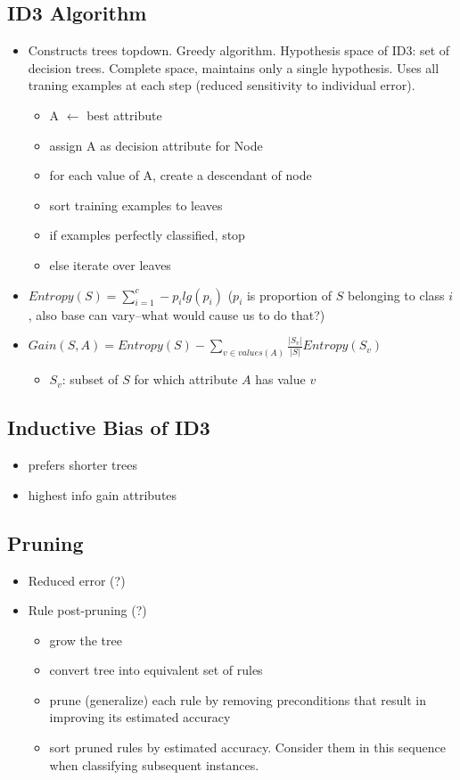 \documentclass[11pt]{article}
\begin{document}
\subsection{ID3 Algorithm}
\begin{itemize}
\item Constructs trees topdown. Greedy algorithm. Hypothesis space of ID3: set of decision trees. Complete space, maintains only a single hypothesis. Uses all traning examples at each step (reduced sensitivity to individual error).
\begin{itemize}
\item A $\leftarrow$ best attribute
\item assign A as decision attribute for Node
\item for each value of A, create a descendant of node
\item sort training examples to leaves
\item if examples perfectly classified, stop
\item else iterate over leaves
\end{itemize}
\item $Entropy(S) = \sum_{i=1}^{c} -p_i lg(p_i)$ ($p_i$ is proportion of $S$ belonging to class $i$, also base can vary--what would cause us to do that?)
\item $Gain(S,A) = Entropy(S) - \sum_{v \in values(A)} \frac{|S_v|}{|S|} Entropy(S_v)$
\begin{itemize}
\item $S_v$: subset of $S$ for which attribute $A$ has value $v$
\end{itemize}
\end{itemize}

\subsection{Inductive Bias of ID3}
\begin{itemize}
\item prefers shorter trees
\item highest info gain attributes
\end{itemize}

\subsection{Pruning}
\begin{itemize}
\item Reduced error  (?)
\item Rule post-pruning (?)
\begin{itemize}
\item grow the tree
\item convert tree into equivalent set of rules
\item prune (generalize) each rule by removing preconditions that result in improving its estimated accuracy
\item sort pruned rules by estimated accuracy. Consider them in this sequence when classifying subsequent instances.
\end{itemize}
\end{itemize}
\end{document}
